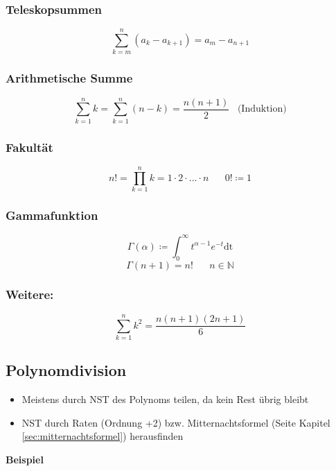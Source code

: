 \documentclass[8pt, a4paper, landscape, fleqn]{scrartcl}
\newenvironment {example}
				{\begin{itshape} \begin{small}}
				{\end{small} \end{itshape}}
\newenvironment {eq}
				{\begin{equation*}}
				{\end{equation*}}
\begin{document}
\begin{multicols*}{3}
				\subsubsection{Teleskopsummen}
					\begin{eq}
						\sum_{k=m}^n \left(a_k - a_{k+1}\right) = a_m-a_{n+1}	
					\end{eq}		
				\subsubsection{Arithmetische Summe}
					\begin{eq}
						\sum_{k=1}^n k = \sum_{k=1}^n (n-k) = \frac{n(n+1)}{2} \hspace{10pt} \text{(Induktion)}
					\end{eq}
				\subsubsection{Fakultät}
					\begin{eq}
						n! = \prod_{k=1}^{n} k = 1 \cdot 2 \cdot \ldots \cdot n \hspace{20pt} 0! \coloneqq 1
					\end{eq}
				\subsubsection{Gammafunktion}
					\begin{eq}
						\Gamma(\alpha) \coloneqq \int_0^{\infty} t^{\alpha-1}e^{-t} \mathrm{dt}
					\end{eq}
					\[\Gamma(n+1) = n! \hspace{20pt} n \in \mathbb{N}\]
			    \subsubsection{Weitere:}
			        \begin{eq}
			            \sum_{k=1}^n k^2 = \frac{n(n+1)(2n+1)}{6}
			        \end{eq}
			\subsection{Polynomdivision}	
				\begin{itemize}
					\item Meistens durch NST des Polynoms teilen, da kein Rest übrig bleibt
					\item NST durch Raten (Ordnung +2) bzw. Mitternachtsformel (Seite \pageref{sec:mitternachtsformel} Kapitel \ref{sec:mitternachtsformel}) herausfinden
				\end{itemize}	
				\begin{example}
					\textbf{Beispiel}\\
					\vspace{-5pt}  \vspace{5pt}
				\end{example}

\end{multicols*}
\end{document}
